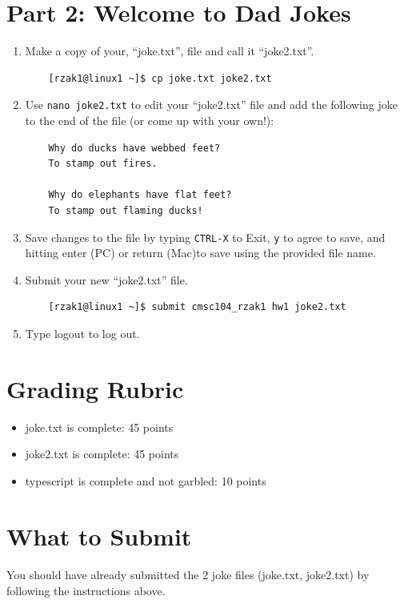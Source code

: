 \documentclass[letter,11pt]{article}
\begin{document}
\section*{Part 2: Welcome to Dad Jokes}
\begin{enumerate}
    \item Make a copy of your, ``joke.txt'', file and call it ``joke2.txt''.
    \begin{verbatim}
    [rzak1@linux1 ~]$ cp joke.txt joke2.txt
    \end{verbatim}
    \item Use \texttt{nano joke2.txt} to edit your ``joke2.txt'' file and add the following joke to the end of the file (or come up with your own!):
    \begin{verbatim}
    Why do ducks have webbed feet?
    To stamp out fires.

    Why do elephants have flat feet?
    To stamp out flaming ducks!
    \end{verbatim}
    \item Save changes to the file by typing \texttt{CTRL-X} to Exit, \texttt{y} to agree to save, and hitting enter (PC) or return (Mac)to save using the provided file name.
    \item Submit your new ``joke2.txt'' file.
    \begin{verbatim}
    [rzak1@linux1 ~]$ submit cmsc104_rzak1 hw1 joke2.txt
    \end{verbatim}
    \item Type logout to log out.
\end{enumerate}

\section*{Grading Rubric}
\begin{itemize}
    \item joke.txt is complete: 45 points
    \item joke2.txt is complete: 45 points
    \item typescript is complete and not garbled: 10 points
\end{itemize}

\section*{What to Submit}
\paragraph{}You should have already submitted the 2 joke files (joke.txt, joke2.txt) by following the instructions above.
\end{document}
